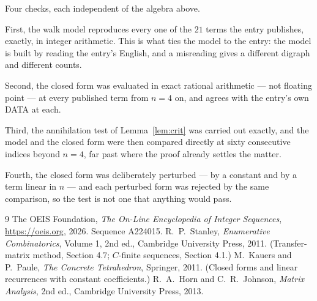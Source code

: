 \documentclass[11pt,a4paper]{article}
\theoremstyle{plain}
\theoremstyle{definition}
\begin{document}
Four checks, each independent of the algebra above.

First, the walk model reproduces every one of the $21$ terms the entry publishes,
exactly, in integer arithmetic. This is what ties the model to the entry: the model is built
by reading the entry's English, and a misreading gives a different digraph and different
counts.

Second, the closed form was evaluated in exact rational arithmetic --- not floating point ---
at every published term from $n=4$ on, and agrees with the entry's own DATA at each.

Third, the annihilation test of Lemma~\ref{lem:crit} was carried out exactly, and the model
and the closed form were then compared directly at sixty consecutive indices beyond
$n=4$, far past where the proof already settles the matter.

Fourth, the closed form was deliberately perturbed --- by a constant and by a term linear in
$n$ --- and each perturbed form was rejected by the same comparison, so the test is not one
that anything would pass.

\begin{thebibliography}{9}
 The OEIS Foundation, \emph{The On-Line Encyclopedia of Integer
Sequences}, \url{https://oeis.org}, 2026. Sequence A224015.
 R.~P.~Stanley, \emph{Enumerative Combinatorics}, Volume 1, 2nd ed.,
Cambridge University Press, 2011. (Transfer-matrix method, Section 4.7; $C$-finite sequences,
Section 4.1.)
 M.~Kauers and P.~Paule, \emph{The Concrete Tetrahedron}, Springer, 2011.
(Closed forms and linear recurrences with constant coefficients.)
 R.~A.~Horn and C.~R.~Johnson, \emph{Matrix Analysis}, 2nd ed., Cambridge
University Press, 2013.
\end{thebibliography}
\end{document}
